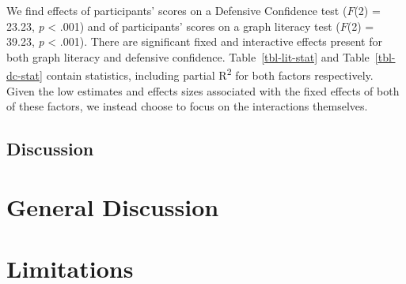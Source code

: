 \documentclass[manuscript,screen,review]{acmart}
\begin{document}
\begin{figure}


\caption{\label{fig-dc-smooth}}

\end{figure}%

We find effects of participants' scores on a Defensive Confidence test
(\(F\)(2) = 23.23, \emph{p} \textless{} .001) and of participants'
scores on a graph literacy test \citep{garcia_2016} (\(F\)(2) = 39.23,
\emph{p} \textless{} .001). There are significant fixed and interactive
effects present for both graph literacy and defensive confidence.
Table~\ref{tbl-lit-stat} and Table~\ref{tbl-dc-stat} contain statistics,
including partial R\textsuperscript{2} for both factors respectively.
Given the low estimates and effects sizes associated with the fixed
effects of both of these factors, we instead choose to focus on the
interactions themselves.

\subsection{Discussion}\label{discussion}

\section{General Discussion}\label{general-discussion}

\section{Limitations}\label{limitations}
\end{document}

